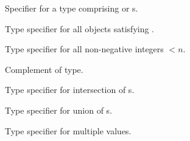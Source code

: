 \begin{LIST}{1cm}
  {
  Specifier for a type comprising  or s.
  }

  {
  Type specifier for all objects satisfying . 
  }

  {
  Type specifier for all non-negative integers $<n$.
  }

  {
  Complement of type.
  }

  {
  Type specifier for intersection of s.
  }

  {
  Type specifier for union of s.
  }

  {
  Type specifier for multiple values.
  }

  \end{LIST}



